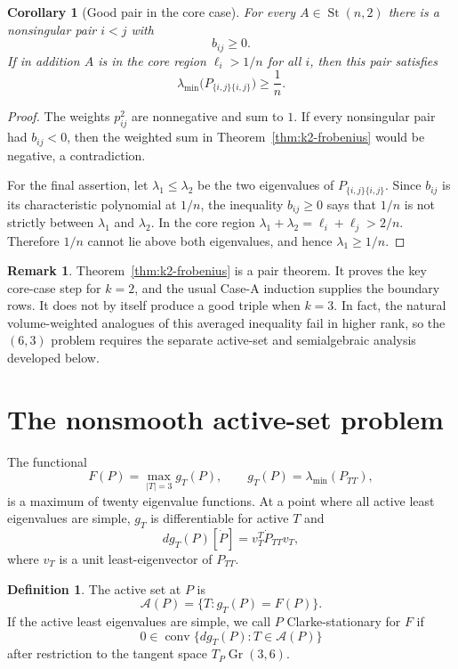 \documentclass[11pt]{article}
\numberwithin{equation}{section}
\newtheorem{corollary}[theorem]{Corollary}
\theoremstyle{definition}
\newtheorem{definition}[theorem]{Definition}
\newtheorem{remark}[theorem]{Remark}
\newcommand{\St}{\operatorname{St}}
\newcommand{\Gr}{\operatorname{Gr}}
\newcommand{\conv}{\operatorname{conv}}
\newcommand{\cA}{\mathcal A}
\begin{document}
\begin{corollary}[Good pair in the core case]\label{cor:k2-good-pair}
For every \(A\in\St(n,2)\) there is a nonsingular pair \(i<j\) with
\[
  b_{ij}\ge0.
\]
If in addition \(A\) is in the core region \(\ell_i>1/n\) for all \(i\), then
this pair satisfies
\[
  \lambda_{\min}\bigl(P_{\{i,j\}\{i,j\}}\bigr)\ge\frac1n.
\]
\end{corollary}

\begin{proof}
The weights \(p_{ij}^2\) are nonnegative and sum to \(1\).  If every nonsingular
pair had \(b_{ij}<0\), then the weighted sum in
Theorem~\ref{thm:k2-frobenius} would be negative, a contradiction.

For the final assertion, let \(\lambda_1\le\lambda_2\) be the two eigenvalues
of \(P_{\{i,j\}\{i,j\}}\).  Since \(b_{ij}\) is its characteristic polynomial at
\(1/n\), the inequality \(b_{ij}\ge0\) says that \(1/n\) is not strictly between
\(\lambda_1\) and \(\lambda_2\).  In the core region
\(\lambda_1+\lambda_2=\ell_i+\ell_j>2/n\).  Therefore \(1/n\) cannot lie above
both eigenvalues, and hence \(\lambda_1\ge1/n\).
\end{proof}

\begin{remark}
Theorem~\ref{thm:k2-frobenius} is a pair theorem.  It proves the key core-case
step for \(k=2\), and the usual Case-A induction supplies the boundary rows.
It does not by itself produce a good triple when \(k=3\).  In fact, the natural
volume-weighted analogues of this averaged inequality fail in higher rank, so
the \((6,3)\) problem requires the separate active-set and semialgebraic
analysis developed below.
\end{remark}

\section{The nonsmooth active-set problem}

The functional
\[
  F(P)=\max_{|T|=3}g_T(P),\qquad g_T(P)=\lambda_{\min}(P_{TT}),
\]
is a maximum of twenty eigenvalue functions.  At a point where all active least
eigenvalues are simple, $g_T$ is differentiable for active $T$ and
\[
  dg_T(P)[\dot P]=v_T^T\dot P_{TT}v_T,
\]
where $v_T$ is a unit least-eigenvector of $P_{TT}$.

\begin{definition}
The active set at $P$ is
\[
  \cA(P)=\{T: g_T(P)=F(P)\}.
\]
If the active least eigenvalues are simple, we call $P$ Clarke-stationary for
$F$ if
\[
  0\in\conv\{dg_T(P):T\in\cA(P)\}
\]
after restriction to the tangent space $T_P\Gr(3,6)$.
\end{definition}
\end{document}

